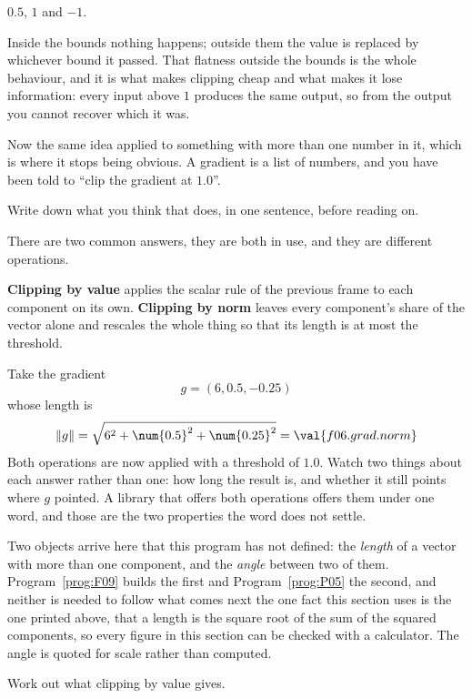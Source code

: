 \begin{fr}
\begin{ansblock}
$\num{0.5}$, $1$ and $-1$.
\end{ansblock}

Inside the bounds nothing happens; outside them the value is replaced by
whichever bound it passed. That flatness outside the bounds is the whole
behaviour, and it is what makes clipping cheap and what makes it lose
information: every input above $1$ produces the same output, so from the
output you cannot recover which it was.

Now the same idea applied to something with more than one number in it, which
is where it stops being obvious. A gradient is a list of numbers, and you have
been told to \enquote{clip the gradient at $\num{1.0}$}.

Write down what you think that does, in one sentence, before reading on.
\dotline
\nextframe
\end{fr}

\begin{fr}
\begin{ansblock}
There are two common answers, they are both in use, and they are different
operations.
\end{ansblock}

\textbf{Clipping by value} applies the scalar rule of the previous frame to
each component on its own. \textbf{Clipping by norm} leaves every component's
share of the vector alone and rescales the whole thing so that its length is
at most the threshold.

Take the gradient
\[ g = (6, \num{0.5}, -\num{0.25}) \]
whose length is
\[ \lVert g \rVert = \sqrt{6^{2} + \num{0.5}^{2} + \num{0.25}^{2}}
   = \val{f06.grad.norm} \]
Both operations are now applied with a threshold of $\num{1.0}$. Watch two
things about each answer rather than one: how long the result is, and whether
it still points where $g$ pointed. A library that offers both operations offers
them under one word, and those are the two properties the word does not
settle.

\begin{rigourbox}
Two objects arrive here that this program has not defined: the \emph{length} of
a vector with more than one component, and the \emph{angle} between two of
them. Program~\ref{prog:F09} builds the first and Program~\ref{prog:P05} the
second, and neither is needed to follow what comes next \dash{} the one fact
this section uses is the one printed above, that a length is the square root of
the sum of the squared components, so every figure in this section can be
checked with a calculator. The angle is quoted for scale rather than computed.
\end{rigourbox}

Work out what clipping by value gives.
\nextframe
\end{fr}

